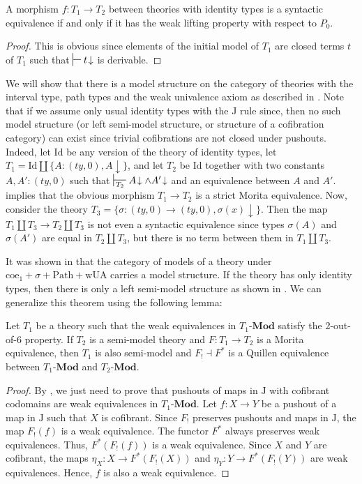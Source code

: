 \documentclass[reqno]{amsart}
\theoremstyle{definition}
\theoremstyle{remark}
\newcommand{\cat}[1]{\mathbf{#1}}
\newcommand{\Mod}[1]{#1\text{-}\cat{Mod}}
\newcommand{\IdT}{\mathrm{Id}}
\newcommand{\wUA}{\mathrm{wUA}}
\newcommand{\coeT}{\mathrm{coe}}
\newcommand{\PathT}{\mathrm{Path}}
\newcommand{\ty}{\mathit{ty}}
\newcommand{\J}{\mathrm{J}}
\numberwithin{figure}{section}
\begin{document}
\begin{prop}
A morphism $f : T_1 \to T_2$ between theories with identity types is a syntactic equivalence if and only if it has the weak lifting property with respect to $P_0$.
\end{prop}
\begin{proof}
This is obvious since elements of the initial model of $T_1$ are closed terms $t$ of $T_1$ such that $\sststile{}{} t\!\downarrow$ is derivable.
\end{proof}

We will show that there is a model structure on the category of theories with the interval type, path types and the weak univalence axiom as described in \cite{alg-models}.
Note that if we assume only usual identity types with the J rule since, then no such model structure (or left semi-model structure, or structure of a cofibration category) can exist since trivial cofibrations are not closed under pushouts.
Indeed, let $\IdT$ be any version of the theory of identity types, let $T_1 = \IdT \amalg \{ A : (\ty,0), A\!\downarrow \}$, and let $T_2$ be $\IdT$ together with two constants $A,A' : (\ty,0)$ such that $\sststile{T_2}{} A\!\downarrow \land A'\!\downarrow$ and an equivalence between $A$ and $A'$.
 implies that the obvious morphism $T_1 \to T_2$ is a strict Morita equivalence.
Now, consider the theory $T_3 = \{ \sigma : (\ty,0) \to (\ty,0), \sigma(x)\!\downarrow \}$.
Then the map $T_1 \amalg T_3 \to T_2 \amalg T_3$ is not even a syntactic equivalence since types $\sigma(A)$ and $\sigma(A')$ are equal in $T_2 \amalg T_3$, but there is no term between them in $T_1 \amalg T_3$.

It was shown in \cite{alg-models} that the category of models of a theory under $\coeT_1 + \sigma + \PathT + \wUA$ carries a model structure.
If the theory has only identity types, then there is only a left semi-model structure as shown in \cite{kap-lum-model}.
We can generalize this theorem using the following lemma:

\begin{lem}
Let $T_1$ be a theory such that the weak equivalences in $\Mod{T_1}$ satisfy the 2-out-of-6 property.
If $T_2$ is a semi-model theory and $F : T_1 \to T_2$ is a Morita equivalence, then $T_1$ is also semi-model and $F_! \dashv F^*$ is a Quillen equivalence between $\Mod{T_1}$ and $\Mod{T_2}$.
\end{lem}
\begin{proof}
By , we just need to prove that pushouts of maps in $\J$ with cofibrant codomains are weak equivalences in $\Mod{T_1}$.
Let $f : X \to Y$ be a pushout of a map in $\J$ such that $X$ is cofibrant.
Since $F_!$ preserves pushouts and maps in $\J$, the map $F_!(f)$ is a weak equivalence.
The functor $F^*$ always preserves weak equivalences.
Thus, $F^*(F_!(f))$ is a weak equivalence.
Since $X$ and $Y$ are cofibrant, the maps $\eta_X : X \to F^*(F_!(X))$ and $\eta_Y : Y \to F^*(F_!(Y))$ are weak equivalences.
Hence, $f$ is also a weak equivalence.
\end{proof}
\end{document}
